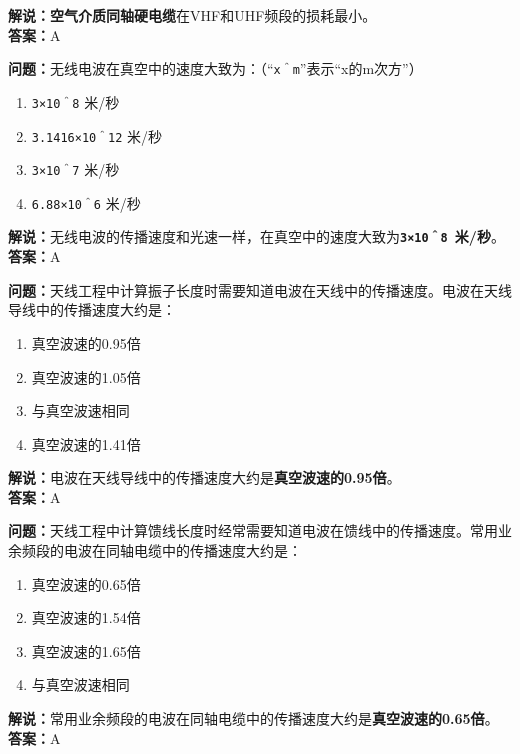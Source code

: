 \textbf{解说：}\textbf{空气介质同轴硬电缆}在VHF和UHF频段的损耗最小。\\\textbf{答案：}A%



\textbf{问题：}无线电波在真空中的速度大致为：（“\texttt{x＾m}”表示“x的m次方”）

\begin{enumerate}[label=\Alph*), leftmargin=1cm]
	\item \texttt{3×10＾8} 米/秒
	\item \texttt{3.1416×10＾12} 米/秒
	\item \texttt{3×10＾7} 米/秒
	\item \texttt{6.88×10＾6} 米/秒
\end{enumerate}

\textbf{解说：}无线电波的传播速度和光速一样，在真空中的速度大致为\textbf{\texttt{3×10＾8 }米/秒}。\\\textbf{答案：}A%



\textbf{问题：}天线工程中计算振子长度时需要知道电波在天线中的传播速度。电波在天线导线中的传播速度大约是：

\begin{enumerate}[label=\Alph*), leftmargin=1cm]
	\item 真空波速的0.95倍
	\item 真空波速的1.05倍
	\item 与真空波速相同
	\item 真空波速的1.41倍
\end{enumerate}

\textbf{解说：}电波在天线导线中的传播速度大约是\textbf{真空波速的0.95倍}。\\\textbf{答案：}A%



\textbf{问题：}天线工程中计算馈线长度时经常需要知道电波在馈线中的传播速度。常用业余频段的电波在同轴电缆中的传播速度大约是：

\begin{enumerate}[label=\Alph*), leftmargin=1cm]
	\item 真空波速的0.65倍
	\item 真空波速的1.54倍
	\item 真空波速的1.65倍
	\item 与真空波速相同
\end{enumerate}

\textbf{解说：}常用业余频段的电波在同轴电缆中的传播速度大约是\textbf{真空波速的0.65倍}。\\\textbf{答案：}A%



